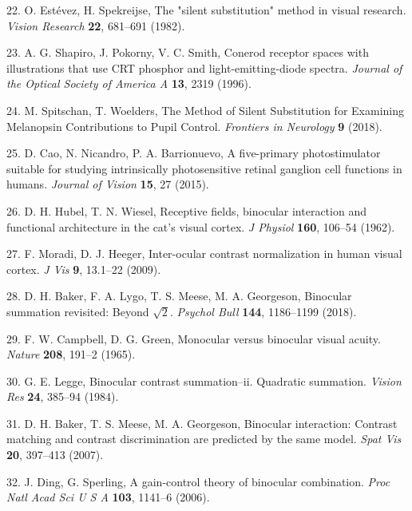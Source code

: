 \documentclass[
]{article}
\begin{document}
\leavevmode\hypertarget{ref-Estevez1982}{}%
22. O. Estévez, H. Spekreijse, The "silent substitution" method in visual research. \emph{Vision Research} \textbf{22}, 681--691 (1982).

\leavevmode\hypertarget{ref-Shapiro1996}{}%
23. A. G. Shapiro, J. Pokorny, V. C. Smith, Conerod receptor spaces with illustrations that use CRT phosphor and light-emitting-diode spectra. \emph{Journal of the Optical Society of America A} \textbf{13}, 2319 (1996).

\leavevmode\hypertarget{ref-Spitschan2018}{}%
24. M. Spitschan, T. Woelders, The Method of Silent Substitution for Examining Melanopsin Contributions to Pupil Control. \emph{Frontiers in Neurology} \textbf{9} (2018).

\leavevmode\hypertarget{ref-Cao2015}{}%
25. D. Cao, N. Nicandro, P. A. Barrionuevo, A five-primary photostimulator suitable for studying intrinsically photosensitive retinal ganglion cell functions in humans. \emph{Journal of Vision} \textbf{15}, 27 (2015).

\leavevmode\hypertarget{ref-Hubel1962}{}%
26. D. H. Hubel, T. N. Wiesel, Receptive fields, binocular interaction and functional architecture in the cat's visual cortex. \emph{J Physiol} \textbf{160}, 106--54 (1962).

\leavevmode\hypertarget{ref-Moradi2009}{}%
27. F. Moradi, D. J. Heeger, Inter-ocular contrast normalization in human visual cortex. \emph{J Vis} \textbf{9}, 13.1--22 (2009).

\leavevmode\hypertarget{ref-Baker2018}{}%
28. D. H. Baker, F. A. Lygo, T. S. Meese, M. A. Georgeson, Binocular summation revisited: Beyond \(\sqrt{2}\). \emph{Psychol Bull} \textbf{144}, 1186--1199 (2018).

\leavevmode\hypertarget{ref-Campbell1965}{}%
29. F. W. Campbell, D. G. Green, Monocular versus binocular visual acuity. \emph{Nature} \textbf{208}, 191--2 (1965).

\leavevmode\hypertarget{ref-Legge1984}{}%
30. G. E. Legge, Binocular contrast summation--ii. Quadratic summation. \emph{Vision Res} \textbf{24}, 385--94 (1984).

\leavevmode\hypertarget{ref-Baker2007}{}%
31. D. H. Baker, T. S. Meese, M. A. Georgeson, Binocular interaction: Contrast matching and contrast discrimination are predicted by the same model. \emph{Spat Vis} \textbf{20}, 397--413 (2007).

\leavevmode\hypertarget{ref-Ding2006}{}%
32. J. Ding, G. Sperling, A gain-control theory of binocular combination. \emph{Proc Natl Acad Sci U S A} \textbf{103}, 1141--6 (2006).
\end{document}
